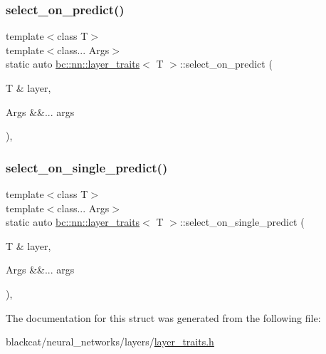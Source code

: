 \subsubsection{\texorpdfstring{select\+\_\+on\+\_\+predict()}{select\_on\_predict()}}
{\footnotesize\ttfamily template$<$class T$>$ \\
template$<$class... Args$>$ \\
static auto \hyperlink{structbc_1_1nn_1_1layer__traits}{bc\+::nn\+::layer\+\_\+traits}$<$ T $>$\+::select\+\_\+on\+\_\+predict (\begin{DoxyParamCaption}\item[{T \&}]{layer,  }\item[{Args \&\&...}]{args }\end{DoxyParamCaption})\hspace{0.3cm}{\ttfamily [inline]}, {\ttfamily [static]}}

\mbox{\label{structbc_1_1nn_1_1layer__traits_a5810b5f90ef816acd95955372fe7223f}} 
\subsubsection{\texorpdfstring{select\+\_\+on\+\_\+single\+\_\+predict()}{select\_on\_single\_predict()}}
{\footnotesize\ttfamily template$<$class T$>$ \\
template$<$class... Args$>$ \\
static auto \hyperlink{structbc_1_1nn_1_1layer__traits}{bc\+::nn\+::layer\+\_\+traits}$<$ T $>$\+::select\+\_\+on\+\_\+single\+\_\+predict (\begin{DoxyParamCaption}\item[{T \&}]{layer,  }\item[{Args \&\&...}]{args }\end{DoxyParamCaption})\hspace{0.3cm}{\ttfamily [inline]}, {\ttfamily [static]}}



The documentation for this struct was generated from the following file\+:\begin{DoxyCompactItemize}
\item 
blackcat/neural\+\_\+networks/layers/\hyperlink{layer__traits_8h}{layer\+\_\+traits.\+h}\end{DoxyCompactItemize}
